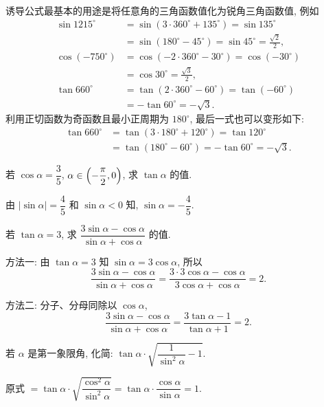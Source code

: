 诱导公式最基本的用途是将任意角的三角函数值化为锐角三角函数值, 例如
\[\begin{aligned}
    \sin1215^\circ
    &= \sin(3\cdot 360^\circ+ 135^\circ)= \sin135^\circ\\
    &= \sin(180^\circ- 45^\circ)= \sin45^\circ= \frac{\sqrt2}{2},\\
    \cos(-750^\circ)
    &= \cos(-2\cdot 360^\circ- 30^\circ)= \cos(-30^\circ)\\
    &= \cos30^\circ= \frac{\sqrt3}{2},\\
    \tan660^\circ
    &= \tan(2\cdot 360^\circ- 60^\circ)= \tan(-60^\circ)\\
    &= -\tan60^\circ= -\sqrt3.
\end{aligned}\]
利用正切函数为奇函数且最小正周期为 $180^\circ$, 最后一式也可以变形如下:
\[\begin{aligned}
    \tan660^\circ
    &= \tan(3\cdot 180^\circ+ 120^\circ)= \tan120^\circ\\
    &= \tan(180^\circ-60^\circ)= -\tan60^\circ= -\sqrt3.
\end{aligned}\]
    
\lianxi
\begin{exercise}
    若 $\cos\alpha =\dfrac35$, 
    $\alpha\in\Bigl(-\dfrac{\pi}2,0\Bigr)$, 求 $\tan\alpha$ 的值.
\end{exercise}
\beginsolution
    由 $|\sin\alpha|= \dfrac45$ 和 $\sin\alpha< 0$ 知, 
    $\sin\alpha= -\dfrac45$.
\endsolution

\begin{exercise}
    若 $\tan\alpha =3$, 求 $\dfrac{3\sin\alpha- \cos\alpha}{\sin\alpha+ \cos\alpha}$ 的值. 
\end{exercise}
\beginsolution
    方法一: 由 $\tan\alpha =3$ 知 $\sin\alpha= 3\cos\alpha$, 所以
    \[\frac{3\sin\alpha- \cos\alpha}{\sin\alpha+ \cos\alpha}
    = \frac{3\cdot 3\cos\alpha- \cos\alpha}{3\cos\alpha+ \cos\alpha}
    = 2.\]

    方法二: 分子、分母同除以 $\cos\alpha$, 
    \[\frac{3\sin\alpha- \cos\alpha}{\sin\alpha+ \cos\alpha}
    = \frac{3\tan\alpha- 1}{\tan\alpha+ 1}
    = 2.\]
\endsolution

\begin{exercise}
    若 $\alpha$ 是第一象限角, 化简: $\tan\alpha\cdot \sqrt{\dfrac1{\sin^2\alpha}- 1}$.
\end{exercise}
\beginsolution
    原式 $= \tan\alpha\cdot \sqrt{\dfrac{\cos^2\alpha}{\sin^2\alpha}}
    = \tan\alpha\cdot \dfrac{\cos\alpha}{\sin\alpha}
    = 1$.
\endsolution

